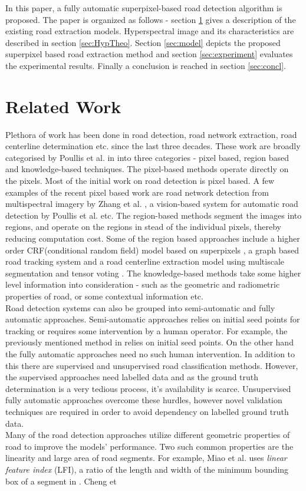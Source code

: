 \documentclass[12pt,twoside]{article}
\theoremstyle{plain}
\theoremstyle{definition}
\theoremstyle{remark}
\begin{document}
In this paper, a fully automatic superpixel-based road detection algorithm is proposed. The paper is organized as follows - section \ref{sec:relatedwork} gives a description of the existing road extraction models. Hyperspectral image and its characteristics are described in section \ref{sec:HypTheo}. Section \ref{sec:model} depicts the proposed superpixel based road extraction method and section \ref{sec:experiment} evaluates the experimental results. Finally a conclusion is reached in section \ref{sec:concl}.

\section{Related Work}
\label{sec:relatedwork}
Plethora of work has been done in road detection, road network extraction, road centerline determination etc. since the last three decades. These work are broadly categorised by Poullis et al. in \cite{Poullis2010} into three categories - pixel based, region based and knowledge-based techniques. The pixel-based methods operate directly on the pixels. Most of the initial work on road detection is pixel based. A few examples of the recent pixel based work are road network detection from multispectral imagery by Zhang et al. \cite{Zhang2006}, a vision-based system for automatic road detection by Poullis et al. \cite{Poullis2010} etc. The region-based methods segment the images into regions, and operate on the regions in stead of the individual pixels, thereby reducing computation cost. Some of the region based approaches include a higher order CRF(conditional random field) model based on superpixels \cite{Wegner2013}, a graph based road tracking system \cite{Seppke2016} and a road centerline extraction model using multiscale segmentation and tensor voting \cite{Cheng}. The knowledge-based methods take some higher level information into consideration - such as the geometric and radiometric properties of road, or some contextual information etc. \\Road detection systems can also be grouped into semi-automatic and fully automatic approaches. Semi-automatic approaches relies on initial seed points for tracking or requires some intervention by a human operator. For example, the previously mentioned method in \cite{Seppke2016} relies on initial seed points. On the other hand the fully automatic approaches need no such human intervention. In addition to this there are supervised and unsupervised road classification methods. However, the supervised approaches need labelled data and as the ground truth determination is a very tedious process, it's availability is scarce. Unsupervised fully automatic approaches overcome these hurdles, however novel validation techniques are required in order to avoid dependency on labelled ground truth data.\\Many of the road detection approaches utilize different geometric properties of road to improve the models' performance. Two such common properties are the linearity and large area of road segments. For example, Miao et al. uses \textit{linear feature index} (LFI), a ratio of the length and width of the minimum bounding box of a segment in \cite{Miao2013}. Cheng et 
\end{document}

